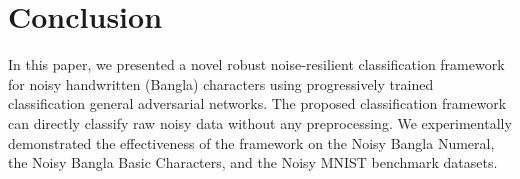 \documentclass[runningheads]{llncs}
\begin{document}
\section{Conclusion}\label{con}

In this paper, we presented a novel robust noise-resilient classification framework for noisy handwritten (Bangla) characters  using  progressively trained  classification general adversarial networks.
The proposed classification  framework can directly classify raw noisy data without any preprocessing.
 We  experimentally demonstrated the effectiveness of the framework on the Noisy Bangla Numeral, the Noisy Bangla  Basic Characters, and the Noisy MNIST benchmark datasets.


\end{document}
